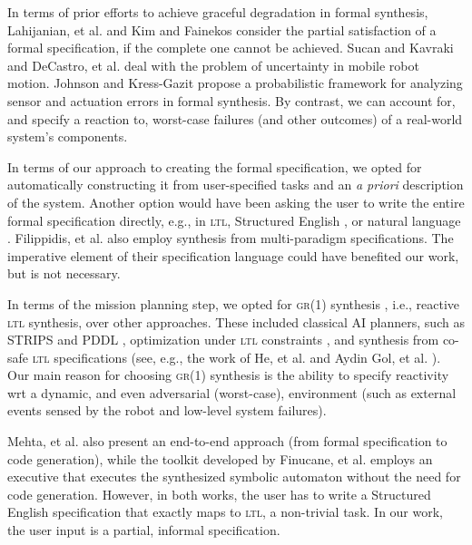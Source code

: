 
In terms of prior efforts to achieve graceful degradation in formal synthesis, Lahijanian, et al. \cite{Kavraki2015AAAI} and Kim and Fainekos \cite{Fainekos2014ICRA} consider the partial satisfaction of a formal specification, if the complete one cannot be achieved.
Sucan and Kavraki \cite{Kavraki2012ICRA} and DeCastro, et al. \cite{Jon2015ICRA} deal with the problem of uncertainty in mobile robot motion.
Johnson and Kress-Gazit \cite{Ben2015IJRR} propose a probabilistic framework for analyzing sensor and actuation errors in formal synthesis.
By contrast, we can account for, and specify a reaction to, worst-case failures (and other outcomes) of a real-world system's components.


In terms of our approach to creating the formal specification, we opted for automatically constructing it from user-specified tasks and an \emph{a priori} description of the system.
Another option would have been asking the user to write the entire formal specification directly, e.g., in \textsc{ltl}, Structured English \cite{JFRKG2012ICRA}, or natural language \cite{Lignos2015AURO}.
Filippidis, et al. \cite{Filippidis2015SYNT} also employ synthesis from multi-paradigm specifications.
The imperative element of their specification language could have benefited our work, but is not necessary.

In terms of the mission planning step, we opted for \textsc{gr(1)} synthesis \cite{Bloem2012GR1}, i.e., reactive \textsc{ltl} synthesis, over other approaches.
These included classical AI planners, such as STRIPS \cite{STRIPS1971AI} and PDDL \cite{PDDL1998TR}, optimization under \textsc{ltl} constraints \cite{Wolff2014ICRA}, and synthesis from co-safe \textsc{ltl} specifications (see, e.g., the work of He, et al. \cite{Kavraki2015ICRA} and Aydin Gol, et al. \cite{Belta2014TAC}).
Our main reason for choosing \textsc{gr(1)} synthesis is the ability to specify reactivity \ac{wrt} a dynamic, and even adversarial (worst-case), environment (such as external events sensed by the robot and low-level system failures).

Mehta, et al.\cite{Ankur2015ISRR} also present an end-to-end approach (from formal specification to code generation), while the toolkit developed by Finucane, et al. \cite{Finucane2010IROS} employs an executive that executes the synthesized symbolic automaton without the need for code generation.
However, in both works, the user has to write a Structured English \cite{JFRKG2012ICRA} specification that exactly maps to \textsc{ltl}, a non-trivial task.
In our work, the user input is a partial, informal specification.


